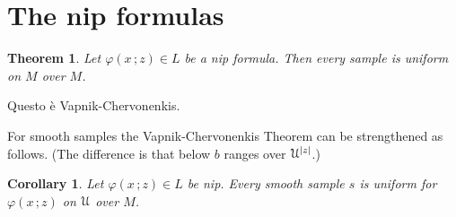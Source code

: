 \documentclass[10pt,openany]{article}
\def\U{\EuScript U}
\def\phi{\varphi}
\newcounter{thm}[section]
\theoremstyle{mio}
\newtheorem{theorem}[thm]{Theorem}
\newtheorem{corollary}[thm]{Corollary}
\newtheorem{definition}[thm]{Definition}
\theoremstyle{liscio}
\def\QED{\noindent\nolinebreak[4]\hspace{\stretch{1}}\rlap{\ \ $\Box$}\medskip}
\renewenvironment{proof}[1][Proof]%
{\begin{trivlist}\item[\hskip\labelsep {\bf #1}]}
{\QED\end{trivlist}}
\renewcommand*{\emph}[1]{%
   \kern-0.2ex 
   \smash{\tikz[baseline]
   \node[ rectangle, fill=emphcolor, rounded corners, 
          inner xsep=.3ex, inner ysep=.2ex, anchor=base,
          minimum height = 3ex
         ]{#1};
   }
   \kern-1.2ex 
}
\begin{document}


  



\section{The nip formulas}\label{nip}

\begin{theorem}\label{thm_VC}
  Let $\phi(x\,;z)\in L$ be a nip formula.
  Then every sample is uniform on $M$ over $M$.
\end{theorem}

\begin{proof}
  Questo è Vapnik-Chervonenkis.
\end{proof}

For smooth samples the Vapnik-Chervonenkis Theorem can be strengthened as follows. (The difference is that below $b$ ranges over $\U^{|z|}$.)

\begin{corollary}
  Let  $\phi(x\,;z)\in L$ be nip.
  Every smooth sample $s$ is uniform for $\phi(x\,;z)$ on $\U$ over $M$.
\end{corollary}
\end{document}
